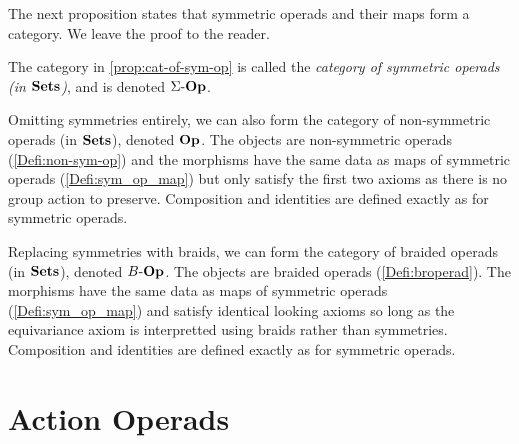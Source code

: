 The next proposition states that symmetric operads and their maps form a category. We leave the proof to the reader.


\begin{nota}\label{nota:cat-of-sym-op}
The category in \cref{prop:cat-of-sym-op} is called the \emph{category of symmetric operads (in $\mathbf{Sets}$)}, and is denoted $\Sigma\mbox{-}\mathbf{Op}$.
\end{nota}

\begin{rem}\label{rem:cat-of-nonsym-op}
Omitting symmetries entirely, we can also form the category of non-symmetric operads (in $\mathbf{Sets}$), denoted $\mathbf{Op}$. The objects are non-symmetric operads (\cref{Defi:non-sym-op}) and the morphisms have the same data as maps of symmetric operads (\cref{Defi:sym_op_map}) but only satisfy the first two axioms as there is no group action to preserve. Composition and identities are defined exactly as for symmetric operads.
\end{rem}

\begin{rem}\label{rem:cat-of-br-op}
Replacing symmetries with braids, we can form the category of braided operads (in $\mathbf{Sets}$), denoted $B\mbox{-}\mathbf{Op}$. The objects are braided operads (\cref{Defi:broperad}). The morphisms have the same data as maps of symmetric operads (\cref{Defi:sym_op_map}) and satisfy identical looking axioms so long as the equivariance axiom is interpretted using braids rather than symmetries. Composition and identities are defined exactly as for symmetric operads.
\end{rem}

\section{Action Operads}\label{sec:aop}

